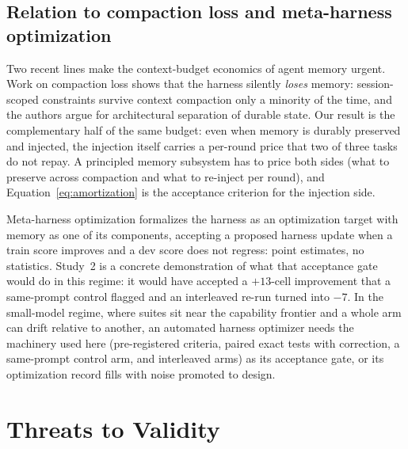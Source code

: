 \documentclass[smallcondensed,natbib]{svjour3}
\begin{document}
\subsection{Relation to compaction loss and meta-harness
optimization}\label{sec:disc-related}

Two recent lines make the context-budget economics of agent memory
urgent. Work on compaction loss \citep{wang2026compint} shows that the
harness silently \emph{loses} memory: session-scoped constraints
survive context compaction only a minority of the time, and the
authors argue for architectural separation of durable state. Our
result is the complementary half of the same budget: even when memory
is durably preserved and injected, the injection itself carries a
per-round price that two of three tasks do not repay. A principled memory
subsystem has to price both sides (what to preserve across
compaction and what to re-inject per round), and
Equation~\eqref{eq:amortization} is the acceptance criterion for the
injection side.

Meta-harness optimization \citep{luo2026autodesign} formalizes the
harness as an optimization target with memory as one of its
components, accepting a proposed harness update when a train score
improves and a dev score does not regress: point estimates, no
statistics. Study~2 is a concrete demonstration of what that
acceptance gate would do in this regime: it would have accepted a
$+13$-cell improvement that a same-prompt control flagged and an
interleaved re-run turned into $-7$. In the small-model regime, where
suites sit near the capability frontier and a whole arm can drift
relative to another, an automated harness optimizer needs the
machinery used here (pre-registered criteria, paired exact tests
with correction, a same-prompt control arm, and interleaved arms) as
its acceptance gate, or its optimization record fills with noise
promoted to design.

\section{Threats to Validity}\label{sec:threats}
\end{document}
